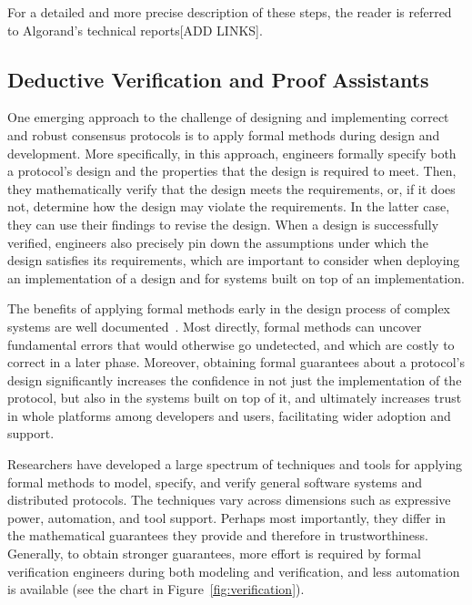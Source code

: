 For a detailed and more precise description of these steps, the reader is referred to Algorand's technical reports[ADD LINKS].

\subsection{Deductive Verification and Proof Assistants}

One emerging approach to the challenge of designing and implementing correct and robust consensus protocols is to apply formal methods during design and development. More specifically, in this approach, engineers formally specify both a protocol's design and the properties that the design is required to meet. Then, they mathematically verify that the design meets the requirements, or, if it does not, determine how the design may violate the requirements. In the latter case, they can use their findings to revise the design. When a design is successfully verified, engineers also precisely pin down the assumptions under which the design satisfies its requirements, which are important to consider when deploying an implementation of a design and for systems built on top of an implementation.

The benefits of applying formal methods early in the design process of complex systems are well documented~\cite{Yang2011,Fonseca2017}. Most directly, formal methods can uncover fundamental errors that would otherwise go undetected, and which are costly to correct in a later phase. Moreover, obtaining formal guarantees about a protocol's design significantly increases the confidence in not just the implementation of the protocol, but also in the systems built on top of it, and ultimately increases trust in whole platforms among developers and users, facilitating wider adoption and support.

Researchers have developed a large spectrum of techniques and tools for applying formal methods to model, specify, and verify general software systems and distributed protocols. The techniques vary across dimensions such as expressive power, automation, and tool support. Perhaps most importantly, they differ in the mathematical guarantees they provide and therefore in trustworthiness. Generally, to obtain stronger guarantees, more effort is required by formal verification engineers during both modeling and verification, and less automation is available (see the chart in Figure~\ref{fig:verification}).

